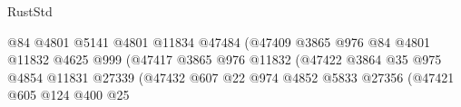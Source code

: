 \begin{lexlean}{RustStd}
\begin{coremodule}
                                                            @84
                                                            @4801
                                                            @5141
                                                            @4801
                                                            @11834
                                                            @47484
                                                            (@47409
                                                              @3865
                                                              @976
                                                              @84
                                                              @4801
                                                              @11832
                                                              @4625
                                                              @999
                                                              (@47417
                                                                @3865
                                                                @976
                                                                @11832
                                                                (@47422
                                                                  @3864
                                                                  @35
                                                                  @975
                                                                  @4854
                                                                  @11831
                                                                  @27339
                                                                  (@47432
                                                                    @607
                                                                    @22
                                                                    @974
                                                                    @4852
                                                                    @5833
                                                                    @27356
                                                                    (@47421
                                                                      @605
                                                                      @124
                                                                      @400
                                                                      @25

\end{coremodule}
\end{lexlean}
